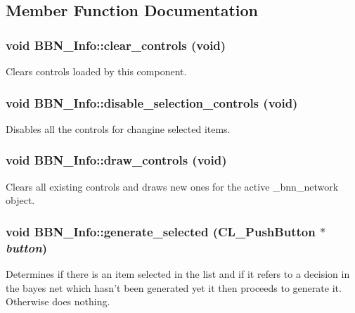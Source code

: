 \subsection{Member Function Documentation}
\hypertarget{classBBN__Info_a7845da935b0819e246cce5255f3bfb33}{
\subsubsection[{clear\_\-controls}]{\setlength{\rightskip}{0pt plus 5cm}void BBN\_\-Info::clear\_\-controls (void)}}
\label{classBBN__Info_a7845da935b0819e246cce5255f3bfb33}
Clears controls loaded by this component. \hypertarget{classBBN__Info_ae83184867ba4dbe1a3338f89ffcdce69}{
\subsubsection[{disable\_\-selection\_\-controls}]{\setlength{\rightskip}{0pt plus 5cm}void BBN\_\-Info::disable\_\-selection\_\-controls (void)}}
\label{classBBN__Info_ae83184867ba4dbe1a3338f89ffcdce69}
Disables all the controls for changine selected items. \hypertarget{classBBN__Info_aecd443df0db694f38e8a4b735d06861a}{
\subsubsection[{draw\_\-controls}]{\setlength{\rightskip}{0pt plus 5cm}void BBN\_\-Info::draw\_\-controls (void)}}
\label{classBBN__Info_aecd443df0db694f38e8a4b735d06861a}
Clears all existing controls and draws new ones for the active \_\-bnn\_\-network object. \hypertarget{classBBN__Info_a636efdafc842f88c0646a1365da1413a}{
\subsubsection[{generate\_\-selected}]{\setlength{\rightskip}{0pt plus 5cm}void BBN\_\-Info::generate\_\-selected (CL\_\-PushButton $\ast$ {\em button})}}
\label{classBBN__Info_a636efdafc842f88c0646a1365da1413a}
Determines if there is an item selected in the list and if it refers to a decision in the bayes net which hasn't been generated yet it then proceeds to generate it. Otherwise does nothing.

